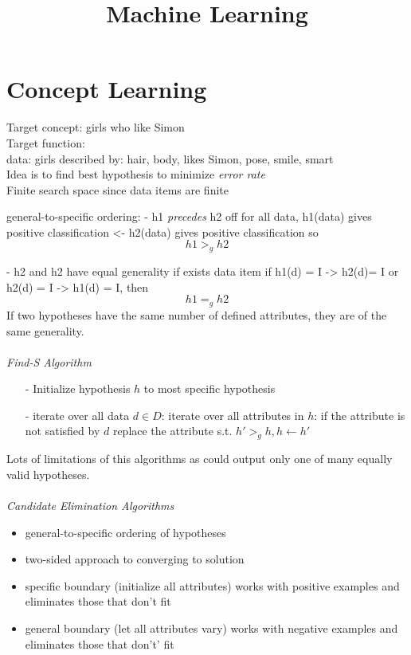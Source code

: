 \documentclass{amsart}
\theoremstyle{definition}
\theoremstyle{remark}
\numberwithin{equation}{section}
\begin{document}
\title{Machine Learning}


\date{}

\maketitle

\section{Concept Learning}
Target concept: girls who like Simon \\
Target function: \\
data: girls described by: hair, body, likes Simon, pose, smile, smart \\

Idea is to find best hypothesis to minimize \emph{error rate}\\
Finite search space since data items are finite

general-to-specific ordering:
- h1 \emph{precedes} h2 off for all data, h1(data) gives positive classification <- h2(data) gives positive classification so
$$
h1 >_{g} h2
$$

- h2 and h2 have equal generality if exists data item if h1(d) = I -> h2(d)= I or h2(d) = I -> h1(d) = I, then
$$
h1 =_{g} h2
$$
If two hypotheses have the same number of defined attributes, they are of the same generality.
\\
\\
\emph{Find-S Algorithm}\\
\begin{itemize}
\item[-] Initialize hypothesis $h$ to most specific hypothesis
\item[-] iterate over all data $d\in D$: iterate over all attributes in $h$:
		if the attribute is not satisfied by $d$ replace the attribute s.t. $h'>_{g}h, h\leftarrow h'$
\end{itemize}
Lots of limitations of this algorithms as could output only one of many equally valid hypotheses.
\\
\\
\emph{Candidate Elimination Algorithms}\\
\begin{itemize}
\item general-to-specific ordering of hypotheses
\item two-sided approach to converging to solution
\item specific boundary (initialize all attributes) works with positive examples and eliminates those that don't fit
\item general boundary (let all attributes vary) works with negative examples and eliminates those that don't' fit
\end{itemize}
\end{document}
